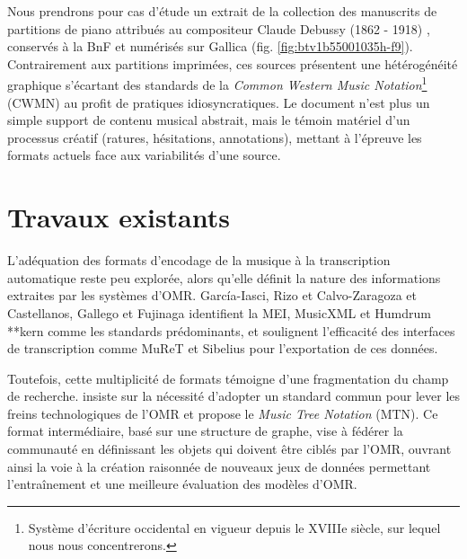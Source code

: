 \documentclass[final,fra]{anthology-ch} %
\begin{document}
Nous prendrons pour cas d'étude un extrait de la collection des manuscrits de partitions de piano attribués au compositeur Claude Debussy (1862 - 1918) \cite{barraque_debussy_1994}, conservés à la BnF et numérisés sur Gallica (fig. \ref{fig:btv1b55001035h-f9}). Contrairement aux partitions imprimées, ces sources présentent une hétérogénéité graphique s'écartant des standards de la \textit{Common Western Music Notation}\footnote{Système d'écriture occidental en vigueur depuis le \textsc{XVIII}e siècle, sur lequel nous nous concentrerons.} (CWMN) au profit de pratiques idiosyncratiques. Le document n'est plus un simple support de contenu musical abstrait, mais le témoin matériel d'un processus créatif (ratures, hésitations, annotations), mettant à l'épreuve les formats actuels face aux variabilités d'une source. 

\section{Travaux existants}

L'adéquation des formats d'encodage de la musique à la transcription automatique reste peu explorée, alors qu'elle définit la nature des informations extraites par les systèmes d'OMR. García-Iasci, Rizo et Calvo-Zaragoza \cite{garcia-iasci_evaluating_2025} et Castellanos, Gallego et Fujinaga \cite{castellanos_deep_2025} identifient la MEI, MusicXML et Humdrum **kern comme les standards prédominants, et soulignent l'efficacité des interfaces de transcription comme MuReT \cite{rizo_design_2023} et Sibelius \cite{avid_technology_sibelius_2024} pour l'exportation de ces données.

Toutefois, cette multiplicité de formats témoigne d'une fragmentation du champ de recherche. \textcite{torras_unified_2024} insiste sur la nécessité d'adopter un standard commun pour lever les freins technologiques de l'OMR et propose le \textit{Music Tree Notation} (MTN). Ce format intermédiaire, basé sur une structure de graphe, vise à fédérer la communauté en définissant les objets qui doivent être ciblés par l'OMR, ouvrant ainsi la voie à la création raisonnée de nouveaux jeux de données permettant l'entraînement et une meilleure évaluation des modèles d'OMR. 
\end{document}

